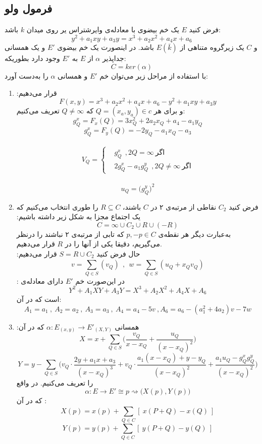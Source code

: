 \subsection{فرمول ولو}
\theorem
فرض کنید 
$E$
یک خم بیضوی با معادله‌ی وایرشتراس یر روی میدان
$k$
باشد:
$$ y^2+a_1xy+a_3y = x^3+a_2x^2+a_4x+a_6 $$
و
$C$
یک زیرگروه متناهی از
$E(\bar{k})$
باشد. در اینصورت یک خم بیضوی
$E'$
و یک همسانی جداپذیر 
$\alpha$
از
$E$
به
$E'$
وجود دارد بطوریکه:
$$C=ker(\alpha)$$
با استفاده از مراحل زیر می‌توان خم
$E'$
و همسانی
$\alpha$
را به‌دست آورد:
\begin{enumerate}
\item{
قرار می‌دهیم:
$$ F(x,y) = x^3+a_2x^2+a_4x+a_6 - y^2+a_1xy+a_3y $$
و برای هر
$Q=(x_a,y_a) \in c$
که
$Q \ne \infty$
تعریف می‌کنیم:
$$ g_Q^x = F_x(Q) = 3x_Q^2+2a_2x_Q+a_4-a_1y_Q$$
$$ g_Q^x = F_y(Q) = -2y_Q-a_1x_Q-a_3 $$
\\
\begin{equation*}
V_Q = 
\begin{cases}
& g_Q^x ~~, 2Q=\infty ~ \text{اگر} \\
& 2g_Q^x - a_1g_Q^y ~~,2Q \ne \infty ~ \text{اگر} 
\end{cases}
\end{equation*}
\\
$$ u_Q = {\Big( g_Q^y \Big)}^2 $$
}
\item{
فرض کنید
$C_2$
نقاطی از مرتبه‌ی ۲ در
$C$
باشند، 
$R \subseteq C$
را طوری انتخاب می‌کنیم که یک اجتماع مجزا به شکل زیر داشته باشیم:
$$ C = {\infty} \cup C_2 \cup R \cup (-R) $$
به‌عبارت دیگر هر نقطه‌ی
$p,-p \in C$
که تابی از مرتبه‌ی ۲ نباشند را درنظر می‌گیریم، دقیقا یکی از آنها را در
$R$
قرار می‌دهیم.
\\
حال فرض کنید
$S=R \cup C_2$
قرار می‌دهیم:
$$ v = \sum\limits^{}_{Q \in S} (v_Q) ~~,~~  w = \sum\limits^{}_{Q \in S}(u_Q+x_Qv_Q) $$
در این‌صورت خم
$E'$
دارای معادله‌ی :
$$Y^2+A_1XY+A_3Y = X^3+A_2X^2+A_4X+A_6$$
است که در آن:
$$ A_1=a_1 ~,~ A_2=a_2 ~,~ A_3=a_3 ~,~ A_4=a_4-5v ~, A_6=a_6-(a_1^2+4a_2)v-7w $$
}

\item{
همسانی
$\alpha : E_{(x,y)} \longrightarrow E'_{(X,Y)}$
که در آن:
$$ X = x + \sum\limits^{}_{Q \in S} \big(\frac{v_Q}{x-x_Q} + \frac{u_Q}{(x-x_Q)^2} \big) $$
$$
 Y = y - \sum\limits^{}_{Q \in S} \big( v_Q \cdot \frac{2y+a_1x+a_3}{(x-x_Q)^3} + v_Q \cdot \frac{a_1(x-x_Q)+y-y_Q}{(x-x_Q)^2} + 
\frac{a_1u_Q - g^{x}_{Q} g^y_Q}{(x-x_Q)^2} \big) 
$$
را تعریف می‌کنیم. در واقع
$$ \alpha : E \longrightarrow E' \cong p \rightsquigarrow \big(X(p),Y(p) \big) $$
که در آن :
$$ X(p) = x(p) + \sum\limits^{}_{Q \in C} [~x(P+Q) - x(Q)~] $$
$$ Y(p) = y(p) + \sum\limits^{}_{Q \in C} [~y(P+Q) - y(Q)~] $$
}
\end{enumerate}~

